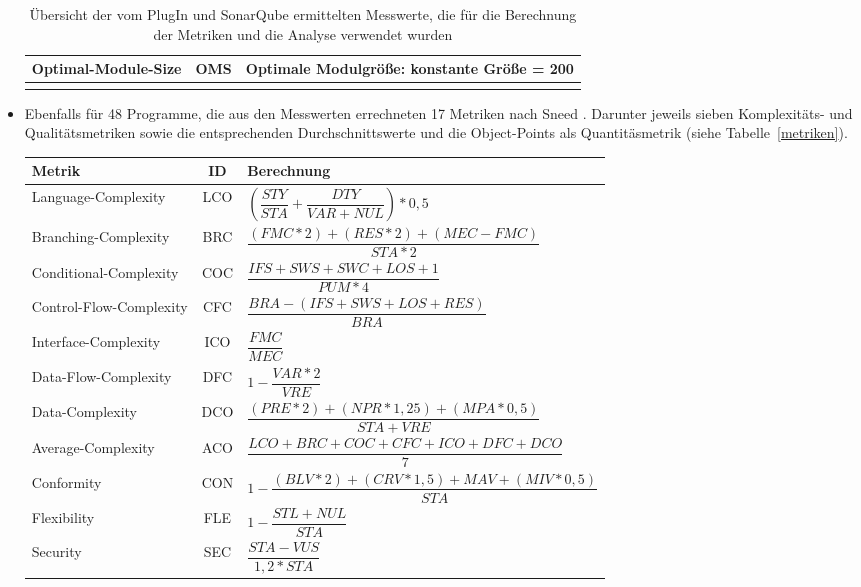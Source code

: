 \documentclass[da,ngerman]{stthesis}
\begin{document}
\begin{itemize}
\begin{center}
\begin{longtabu}{|p{0.23\textwidth}|c|p{0.63\textwidth}|}
    					\hline
    					Optimal-Module-Size & OMS & Optimale Modulgröße: konstante Größe = 200\\
    					\hline
    					\caption{Übersicht der vom PlugIn und SonarQube ermittelten Messwerte, die für die Berechnung der Metriken und die Analyse verwendet wurden}
						\label{messwerte} \\
  					\end{longtabu}  
  				\end{center}
  				\item Ebenfalls für 48 Programme, die aus den Messwerten errechneten 17 Metriken nach Sneed \cite{SoftAuditDoku}. Darunter jeweils sieben Komplexitäts- und Qualitätsmetriken sowie die entsprechenden Durchschnittswerte und die Object-Points als Quantitäsmetrik (siehe Tabelle~\ref{metriken}). 
  				\begin{center}
					\tabulinesep=1.5mm
					\begin{longtabu}{|p{0.18\textwidth}|c|p{0.68\textwidth}|}
						\hline
  						\textbf{Metrik} & \textbf{ID} & \textbf{Berechnung} \\
  						\hline
    					Language-Complexity & LCO & $(\dfrac{STY}{STA} + \dfrac{DTY}{VAR + NUL}) * 0,5$\\
    					\hline
    					Branching-Complexity & BRC & $\dfrac{(FMC * 2) + (RES * 2) + (MEC - FMC)}{STA * 2}$\\
    					\hline
    					Conditional-Complexity & COC & $\dfrac{IFS + SWS + SWC + LOS + 1}{PUM * 4}$\\
    					\hline
    					Control-Flow-Complexity & CFC & $\dfrac{BRA - (IFS + SWS + LOS + RES)}{BRA}$\\
    					\hline
    					Interface-Complexity & ICO & $\dfrac{FMC}{MEC}$\\
    					\hline
    					Data-Flow-Complexity & DFC & $1 - \dfrac{VAR * 2}{VRE}$\\
    					\hline
    					Data-Complexity & DCO & $\dfrac{(PRE * 2) + (NPR * 1,25) + (MPA * 0,5)}{STA + VRE}$\\
    					\hline
    					Average-Complexity & ACO & $\dfrac{LCO + BRC + COC + CFC + ICO + DFC + DCO}{7}$\\
  						\hline
    					Conformity & CON & $1 - \dfrac{(BLV * 2) + (CRV * 1,5) + MAV + (MIV * 0,5)}{STA}$\\
    					\hline
    					Flexibility & FLE & $1 - \dfrac{STL + NUL}{STA}$\\
    					\hline
    					Security & SEC & $\dfrac{STA - VUS}{1,2 * STA}$\\

\end{longtabu}
\end{center}
\end{itemize}
\end{document}
